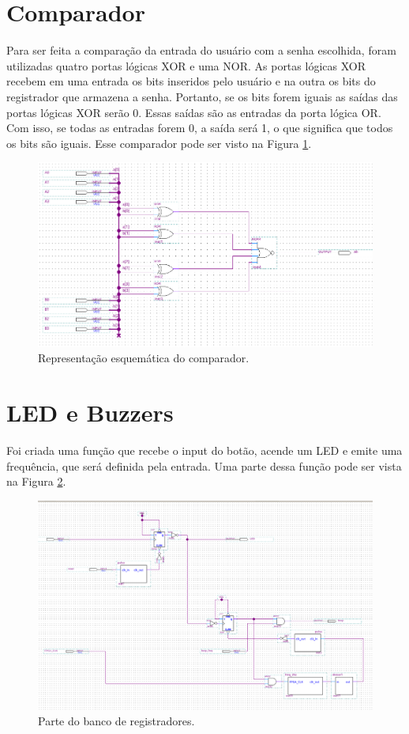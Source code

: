 \section{Comparador}

Para ser feita a comparação da entrada do usuário com a senha escolhida, foram utilizadas quatro portas lógicas XOR e uma NOR. As portas lógicas XOR recebem em uma entrada os bits inseridos pelo usuário e na outra os bits do registrador que armazena a senha. Portanto, se os bits forem iguais as saídas das portas lógicas XOR serão 0. Essas saídas são as entradas da porta lógica OR. Com isso, se todas as entradas forem 0, a saída será 1, o que significa que todos os bits são iguais. Esse comparador pode ser visto na Figura \ref{fig:2.19}.

\begin{figure}[H]
	\centering
	\includegraphics[width=1\columnwidth]{FIGURAS/cap_2/comparador.png}
	\caption{Representação esquemática do comparador.}
        \label{fig:2.19}
\end{figure}

\section{LED e Buzzers}

Foi criada uma função que recebe o input do botão, acende um LED e emite uma frequência, que será definida pela entrada. Uma parte dessa função pode ser vista na Figura \ref{fig:2.20}.

\begin{figure}[H]
	\centering
	\includegraphics[width=1\columnwidth]{FIGURAS/cap_2/led_buzzer.png}
	\caption{Parte do banco de registradores.}
        \label{fig:2.20}
\end{figure}

